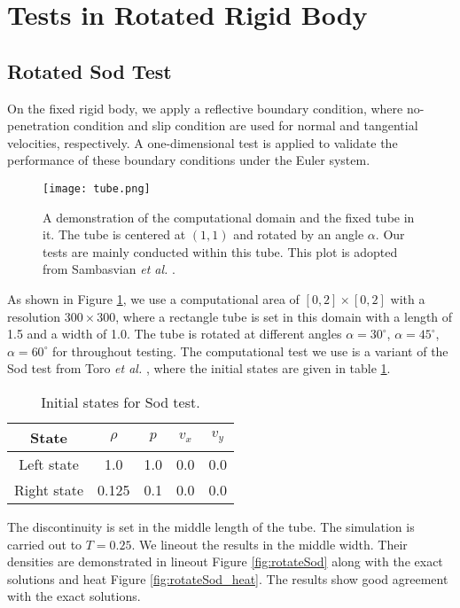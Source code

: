 \section{Tests in Rotated Rigid Body}
\subsection{Rotated Sod Test}
On the fixed rigid body, we apply a reflective boundary condition, where no-penetration condition and slip condition are used for normal and tangential velocities, respectively. A one-dimensional test is applied to validate the performance of these boundary conditions under the Euler system. 
\begin{figure}[htbp!]
    \centering
    \texttt{[image: tube.png]}
    \caption[Rotated Tube]{A demonstration of the computational domain and the fixed tube in it. The tube is centered at $(1,1)$ and rotated by an angle $\alpha$. Our tests are mainly conducted within this tube. This plot is adopted from Sambasvian \textit{et al.} \cite{sambasivan2009ghost}.}
    \label{fig:tube}
\end{figure}
As shown in Figure \ref{fig:tube}, we use a computational area of $[0,2]\times[0,2]$ with a resolution $300\times300$, where a rectangle tube is set in this domain with a length of 1.5 and a width of 1.0. The tube is rotated at different angles $\alpha=30^\circ$, $\alpha=45^\circ$, $\alpha=60^\circ$ for throughout testing. The computational test we use is a variant of the Sod test from Toro \textit{et al.} \cite{toro2013riemann}, where the initial states are given in table \ref{tab:sod}.
\begin{table}[H]
\centering
\caption[Sod test]{Initial states for Sod test.}
\begin{tabular}{|c|c|c|c|c|}
\hline
State & $\rho$ & $p$ & $v_x$ & $v_y$ \\
\hline
Left state & 1.0 & 1.0 & 0.0 & 0.0 \\
\hline
Right state & 0.125 & 0.1 & 0.0 & 0.0 \\
\hline
\end{tabular}
\label{tab:sod}
\end{table}
The discontinuity is set in the middle length of the tube. The simulation is carried out to $T=0.25$. We lineout the results in the middle width.  Their densities are demonstrated in lineout Figure \ref{fig:rotateSod} along with the exact solutions and heat Figure \ref{fig:rotateSod_heat}. The results show good agreement with the exact solutions.


